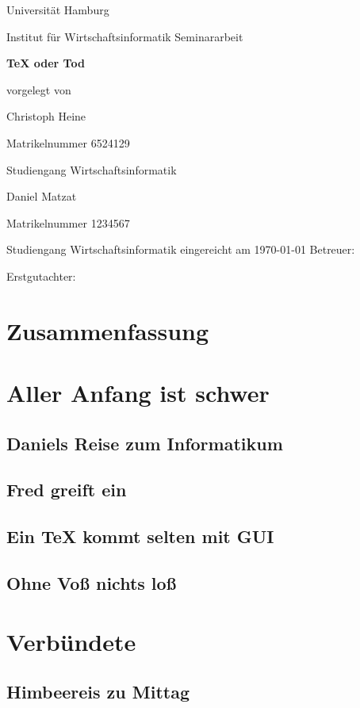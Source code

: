 \documentclass[12pt]{scrartcl}
\begin{document}
	
	\newpage
	\thispagestyle{empty}
	\begin{center}\Large
		Universität Hamburg \par
		Institut für Wirtschaftsinformatik
		\vfill
		Seminararbeit
		\vfill
		{\Large\textsf{\textbf{TeX oder Tod}}\par}
		\vfill
		vorgelegt von 
		\par\bigskip
		Christoph Heine \par
		Matrikelnummer 6524129 \par
		Studiengang Wirtschaftsinformatik \par
		Daniel Matzat \par
		Matrikelnummer 1234567 \par
		Studiengang Wirtschaftsinformatik
		\vfill
		eingereicht am \today
		\vfill 
		Betreuer:  \par
		Erstgutachter:  \par
	\end{center}
	
	\newpage
	\section*{Zusammenfassung}
	
	\newpage
	\section{Aller Anfang ist schwer}
	\subsection{Daniels Reise zum Informatikum}
	\subsection{Fred greift ein}
	\subsection{Ein TeX kommt selten mit GUI}
	\subsection{Ohne Voß nichts loß}
	
	\newpage
	\section{Verbündete}
	\subsection{Himbeereis zu Mittag}
\end{document}
